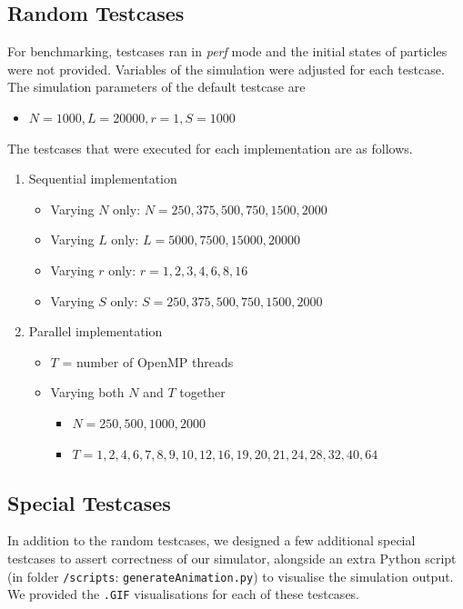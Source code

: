 \documentclass[12pt]{article}
\begin{document}
\subsection{Random Testcases}

For benchmarking, testcases ran in \textit{perf} mode and the initial states of particles were not provided. Variables of the simulation were adjusted for each testcase. \\

The simulation parameters of the default testcase are
\begin{itemize}
	\item $N = 1000, L=20000, r=1, S=1000$
\end{itemize}

The testcases that were executed for each implementation are as follows. 
\begin{enumerate}
	\item Sequential implementation
	\begin{itemize}
		\item Varying $N$ only: $N = 250, 375, 500, 750, 1500, 2000$
		\item Varying $L$ only: $L = 5000, 7500, 15000, 20000$
		\item Varying $r$ only: $r = 1, 2, 3, 4, 6, 8, 16$
		\item Varying $S$ only: $S = 250, 375, 500, 750, 1500, 2000$
	\end{itemize}
	
	\item Parallel implementation
	\begin{itemize}
		\item $T$ = number of OpenMP threads
		\item Varying both $N$ and $T$ together
		\begin{itemize}
			\item $N = 250, 500, 1000, 2000$
			\item $T = 1, 2, 4, 6, 7, 8, 9, 10, 12, 16, 19, 20, 21, 24, 28, 32, 40, 64$
		\end{itemize}
	\end{itemize}
\end{enumerate}

\pagebreak

\subsection{Special Testcases}

In addition to the random testcases, we designed a few additional special testcases to assert correctness of our simulator, alongside an extra Python script (in folder \texttt{/scripts}: \texttt{generateAnimation.py}) to visualise the simulation output. We provided the \texttt{.GIF} visualisations for each of these testcases. \\
\end{document}
